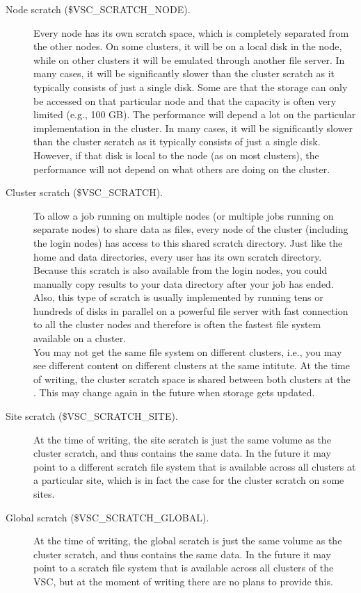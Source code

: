 \begin{description}
\item[Node scratch (\$VSC\_SCRATCH\_NODE).]
Every node has its own scratch space, which is completely separated from the other nodes.
On some clusters, it will be on a local disk in the node, while on other
clusters it will be emulated through another file server. In many cases,
it will be significantly slower than the cluster scratch as it typically
consists of just a single disk.
Some  are that the storage
can only be accessed on that particular node and that the capacity is often very limited (e.g., 100 GB).
The performance will depend a lot on the particular implementation in the cluster. In many cases,
it will be significantly slower than the cluster scratch as it typically
consists of just a single disk. However, if that disk is local to the node
(as on most clusters), the performance will not depend on what others are
doing on the cluster.
\item[Cluster scratch (\$VSC\_SCRATCH).]
To allow a job running on multiple nodes (or multiple jobs running on
separate nodes) to share data as files, every node of the cluster
(including the login nodes) has access to this shared scratch directory.
Just like the home and data directories, every user has its own scratch
directory. Because this scratch is also available from the login nodes, you
could manually copy results to your data directory after your job has
ended. Also, this type of scratch is usually implemented by running tens or
hundreds of disks in parallel on a powerful file server with fast connection
to all the cluster nodes and therefore is often the fastest file system
available on a cluster. \\
You may not get the same file system on different clusters, i.e., you
may see different content on different clusters at the same intitute.
\ifantwerpen
  At the time of writing, the cluster scratch space is shared between both clusters
  at the \university. This may change again in the future when storage gets
  updated.
\fi
\item[Site scratch (\$VSC\_SCRATCH\_SITE).]
At the time of writing, the site scratch is just the same
volume as the cluster scratch, and thus contains the same data.
In the future it may point to a different scratch file system
that is available across all clusters at a particular site, which is in
fact the case for the cluster scratch on some sites.
\item[Global scratch (\$VSC\_SCRATCH\_GLOBAL).]
At the time of writing, the global scratch is just the same
volume as the cluster scratch, and thus contains the same data.
In the future it may point to a scratch file system
that is available across all clusters of the VSC, but at the moment
of writing there are no plans to provide this.
\end{description}

